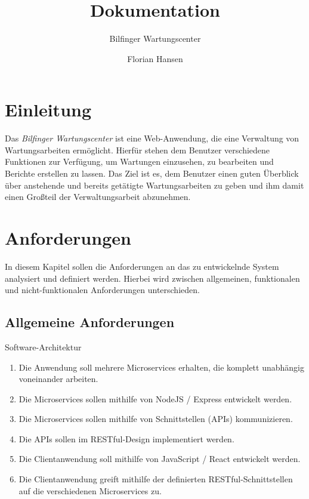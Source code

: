 \documentclass[12pt]{scrreprt}
\title{Dokumentation}
\subtitle{Bilfinger Wartungscenter}
\author{Florian Hansen}
\newcommand{\itemh}[1]{{\bfseries\large\item #1}}
\begin{document}
  \maketitle

  \chapter{Einleitung}
  Das \textit{Bilfinger Wartungscenter} ist eine Web-Anwendung, die eine Verwaltung von Wartungsarbeiten ermöglicht.
  Hierfür stehen dem Benutzer verschiedene Funktionen zur Verfügung, um Wartungen einzusehen, zu bearbeiten und
  Berichte erstellen zu lassen. Das Ziel ist es, dem Benutzer einen guten Überblick über anstehende und bereits
  getätigte Wartungsarbeiten zu geben und ihm damit einen Großteil der Verwaltungsarbeit abzunehmen.

  \chapter{Anforderungen}
  In diesem Kapitel sollen die Anforderungen an das zu entwickelnde System analysiert und definiert werden. Hierbei wird
  zwischen allgemeinen, funktionalen und nicht-funktionalen Anforderungen unterschieden.

  \section{Allgemeine Anforderungen}
  \begin{enumerate}
    \itemh{Software-Architektur}
    \begin{enumerate}
      \item Die Anwendung soll mehrere Microservices erhalten, die komplett unabhängig voneinander arbeiten.
      \item Die Microservices sollen mithilfe von NodeJS / Express entwickelt werden.
      \item Die Microservices sollen mithilfe von Schnittstellen (APIs) kommunizieren.
      \item Die APIs sollen im RESTful-Design implementiert werden.
      \item Die Clientanwendung soll mithilfe von JavaScript / React entwickelt werden.
      \item Die Clientanwendung greift mithilfe der definierten RESTful-Schnittstellen auf die verschiedenen
        Microservices zu.
    \end{enumerate}
  \end{enumerate}
\end{document}

